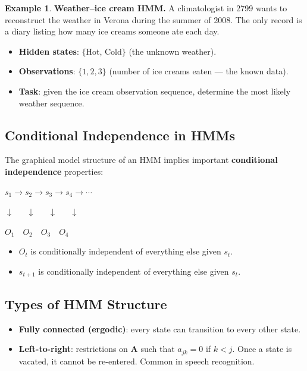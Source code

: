 \documentclass[11pt,a4paper]{article}
\theoremstyle{definition}
\newtheorem{example}{Example}[section]
\theoremstyle{plain}
\theoremstyle{remark}
\begin{document}
\begin{example}
\textbf{Weather--ice cream HMM.} A climatologist in 2799 wants to reconstruct the weather in Verona during the summer of 2008. The only record is a diary listing how many ice creams someone ate each day.
\begin{itemize}
    \item \textbf{Hidden states}: $\{$Hot, Cold$\}$ (the unknown weather).
    \item \textbf{Observations}: $\{1, 2, 3\}$ (number of ice creams eaten --- the known data).
    \item \textbf{Task}: given the ice cream observation sequence, determine the most likely weather sequence.
\end{itemize}
\end{example}

\subsection{Conditional Independence in HMMs}

The graphical model structure of an HMM implies important \textbf{conditional independence} properties:

\begin{center}
$s_1 \to s_2 \to s_3 \to s_4 \to \cdots$

$\downarrow \quad\;\; \downarrow \quad\;\; \downarrow \quad\;\; \downarrow$

$O_1 \quad O_2 \quad O_3 \quad O_4$
\end{center}

\begin{itemize}
    \item $O_t$ is conditionally independent of everything else given $s_t$.
    \item $s_{t+1}$ is conditionally independent of everything else given $s_t$.
\end{itemize}

\subsection{Types of HMM Structure}

\begin{itemize}
    \item \textbf{Fully connected (ergodic)}: every state can transition to every other state.
    \item \textbf{Left-to-right}: restrictions on $\mathbf{A}$ such that $a_{jk} = 0$ if $k < j$. Once a state is vacated, it cannot be re-entered. Common in speech recognition.
\end{itemize}
\end{document}
